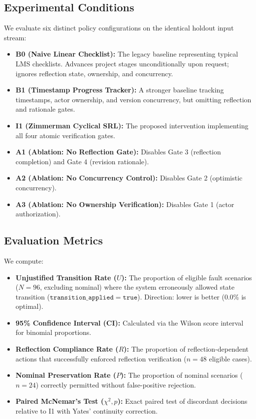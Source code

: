 \documentclass[11pt,a4paper]{article}
\begin{document}
\subsection{Experimental Conditions}
We evaluate six distinct policy configurations on the identical holdout input stream:
\begin{itemize}
    \item \textbf{B0 (Naive Linear Checklist):} The legacy baseline representing typical LMS checklists. Advances project stages unconditionally upon request; ignores reflection state, ownership, and concurrency.
    \item \textbf{B1 (Timestamp Progress Tracker):} A stronger baseline tracking timestamps, actor ownership, and version concurrency, but omitting reflection and rationale gates.
    \item \textbf{I1 (Zimmerman Cyclical SRL):} The proposed intervention implementing all four atomic verification gates.
    \item \textbf{A1 (Ablation: No Reflection Gate):} Disables Gate 3 (reflection completion) and Gate 4 (revision rationale).
    \item \textbf{A2 (Ablation: No Concurrency Control):} Disables Gate 2 (optimistic concurrency).
    \item \textbf{A3 (Ablation: No Ownership Verification):} Disables Gate 1 (actor authorization).
\end{itemize}

\subsection{Evaluation Metrics}
We compute:
\begin{itemize}
    \item \textbf{Unjustified Transition Rate ($U$):} The proportion of eligible fault scenarios ($N=96$, excluding nominal) where the system erroneously allowed state transition ($\mathtt{transition\_applied} = \mathtt{true}$). Direction: lower is better (0.0\% is optimal).
    \item \textbf{95\% Confidence Interval (CI):} Calculated via the Wilson score interval for binomial proportions.
    \item \textbf{Reflection Compliance Rate ($R$):} The proportion of reflection-dependent actions that successfully enforced reflection verification ($n=48$ eligible cases).
    \item \textbf{Nominal Preservation Rate ($P$):} The proportion of nominal scenarios ($n=24$) correctly permitted without false-positive rejection.
    \item \textbf{Paired McNemar's Test ($\chi^2, p$):} Exact paired test of discordant decisions relative to I1 with Yates' continuity correction.
\end{itemize}
\end{document}
